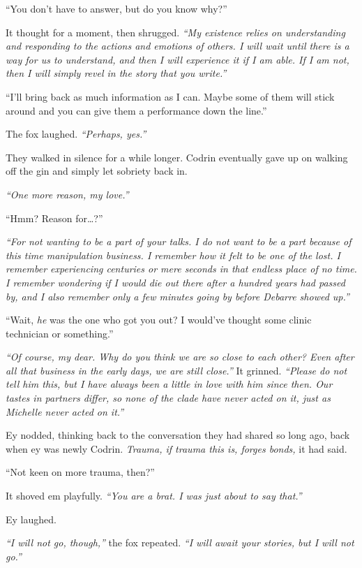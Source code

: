 ``You don't have to answer, but do you know why?''

It thought for a moment, then shrugged. \emph{``My existence relies on understanding and responding to the actions and emotions of others. I will wait until there is a way for us to understand, and then I will experience it if I am able. If I am not, then I will simply revel in the story that you write.''}

``I'll bring back as much information as I can. Maybe some of them will stick around and you can give them a performance down the line.''

The fox laughed. \emph{``Perhaps, yes.''}

They walked in silence for a while longer. Codrin eventually gave up on walking off the gin and simply let sobriety back in.

\emph{``One more reason, my love.''}

``Hmm? Reason for\ldots?''

\emph{``For not wanting to be a part of your talks. I do not want to be a part because of this time manipulation business. I remember how it felt to be one of the lost. I remember experiencing centuries or mere seconds in that endless place of no time. I remember wondering if I would die out there after a hundred years had passed by, and I also remember only a few minutes going by before Debarre showed up.''}

``Wait, \emph{he} was the one who got you out? I would've thought some clinic technician or something.''

\emph{``Of course, my dear. Why do you think we are so close to each other? Even after all that business in the early days, we are still close.''} It grinned. \emph{``Please do not tell him this, but I have always been a little in love with him since then. Our tastes in partners differ, so none of the clade have never acted on it, just as Michelle never acted on it.''}

Ey nodded, thinking back to the conversation they had shared so long ago, back when ey was newly Codrin. \emph{Trauma, if trauma this is, forges bonds,} it had said.

``Not keen on more trauma, then?''

It shoved em playfully. \emph{``You are a brat. I was just about to say that.''}

Ey laughed.

\emph{``I will not go, though,''} the fox repeated. \emph{``I will await your stories, but I will not go.''}

